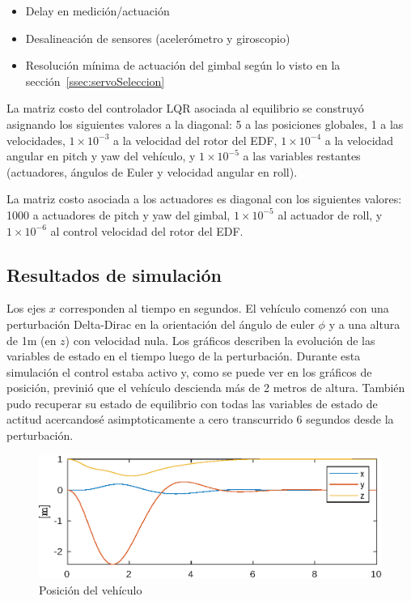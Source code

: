 \begin{itemize}
    \item Delay en medición/actuación
    \item Desalineación de sensores (acelerómetro y giroscopio)
    \item Resolución mínima de actuación del gimbal según lo visto en la sección~\ref{ssec:servoSeleccion}
\end{itemize}

La matriz costo del controlador LQR asociada al equilibrio se construyó asignando los siguientes valores a la diagonal: 5 a las posiciones globales, 1 a las velocidades, $1\times10^{-3}$ a la velocidad del rotor del EDF, $1\times10^{-4}$ a la velocidad angular en pitch y yaw del vehículo, y $1\times10^{-5}$ a las variables restantes (actuadores, ángulos de Euler y velocidad angular en roll).

\medskip

La matriz costo asociada a los actuadores es diagonal con los siguientes valores: 1000 a actuadores de pitch y yaw del gimbal, $1\times10^{-5}$ al actuador de roll, y $1\times10^{-6}$ al control velocidad del rotor del EDF.


\subsection{Resultados de simulación}

Los ejes $x$ corresponden al tiempo en segundos. El vehículo comenzó con una perturbación Delta-Dirac en la orientación del ángulo de euler $\phi$ y a una altura de 1m (en $z$) con velocidad nula. Los gráficos describen la evolución de las variables de estado en el tiempo luego de la perturbación. Durante esta simulación el control estaba activo y, como se puede ver en los gráficos de posición, previnió que el vehículo descienda más de 2 metros de altura. También pudo recuperar su estado de equilibrio con todas las variables de estado de actitud acercandosé asimptoticamente a cero transcurrido 6 segundos desde la perturbación.

\begin{figure}[!ht]
    \centering
    \includegraphics[width=0.8\linewidth]{fig/pos_edf}
    \caption{Posición del vehículo}
    \label{fig:pos_edf}
\end{figure}

